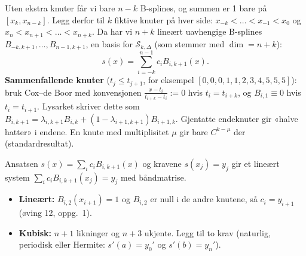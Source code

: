 \begin{defn}
Uten ekstra knuter får vi bare $n-k$ B-splines, og summen er 1 bare på $[x_k,x_{n-k}]$. Legg derfor til $k$ fiktive knuter på hver side: $x_{-k}<\dots<x_{-1}<x_0$ og $x_n<x_{n+1}<\dots<x_{n+k}$. Da har vi $n+k$ lineært uavhengige B-splines $B_{-k,k+1},\dots,B_{n-1,k+1}$, en basis for $\mathcal S_{k,\Delta}$ (som stemmer med $\dim=n+k$):
\[
s(x)=\sum_{i=-k}^{n-1}c_iB_{i,k+1}(x).
\]
\textbf{Sammenfallende knuter} ($t_j\le t_{j+1}$, for eksempel $[0,0,0,1,1,2,3,4,5,5,5]$): bruk Cox--de Boor med konvensjonen $\frac{x-t_i}{t_{i+k}-t_i}:=0$ hvis $t_i=t_{i+k}$, og $B_{i,1}\equiv0$ hvis $t_i=t_{i+1}$. Lysarket skriver dette som $B_{i,k+1}=\lambda_{i,k+1}B_{i,k}+(1-\lambda_{i+1,k+1})B_{i+1,k}$. Gjentatte endeknuter gir «halve hatter» i endene. En knute med multiplisitet $\mu$ gir bare $C^{k-\mu}$ der (standardresultat).
\end{defn}
\begin{oppskrift}
Ansatsen $s(x)=\sum_ic_iB_{i,k+1}(x)$ og kravene $s(x_j)=y_j$ gir et lineært system $\sum_ic_iB_{i,k+1}(x_j)=y_j$ med båndmatrise.
\begin{itemize}
  \item \textbf{Lineært:} $B_{i,2}(x_{i+1})=1$ og $B_{i,2}$ er null i de andre knutene, så $c_i=y_{i+1}$ (øving 12, oppg.~1).
  \item \textbf{Kubisk:} $n+1$ likninger og $n+3$ ukjente. Legg til to krav (naturlig, periodisk eller Hermite: $s'(a)=y_0'$ og $s'(b)=y_n'$).
\end{itemize}
\end{oppskrift}

